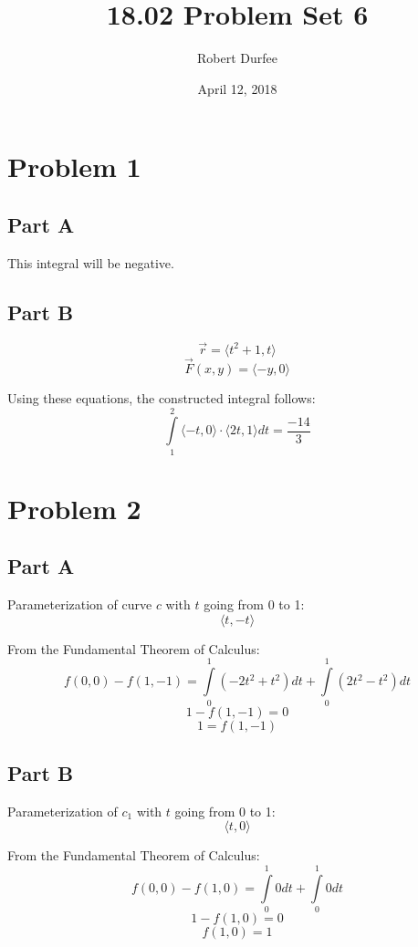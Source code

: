 \documentclass{article}
\title{ 18.02 Problem Set 6 }
\author{ Robert Durfee }
\date{ April 12, 2018 }
\begin{document}
\maketitle

\section*{Problem 1}

\subsection*{Part A}


This integral will be negative.

\subsection*{Part B}

$$\vec{r} = \langle t^2 + 1, t \rangle $$
$$\vec{F}(x, y) = \langle -y, 0 \rangle $$

Using these equations, the constructed integral follows:
$$\int\limits_1^2 \langle -t, 0 \rangle \cdot \langle 2t, 1 \rangle dt =
\frac{-14}{3} $$

\section*{Problem 2}

\subsection*{Part A}

Parameterization of curve $c$ with $t$ going from 0 to 1:
$$ \langle t, -t \rangle $$

From the Fundamental Theorem of Calculus:
$$ f(0, 0) - f(1, -1) = \int\limits_0^1 (-2t^2 + t^2) dt + \int\limits_0^1 (2t^2
- t^2) dt $$
$$ 1 - f(1, -1) = 0 $$
$$ 1 = f(1, -1) $$

\subsection*{Part B}

Parameterization of $c_1$ with $t$ going from 0 to 1:
$$ \langle t, 0 \rangle $$

From the Fundamental Theorem of Calculus:
$$ f(0, 0) - f(1, 0) = \int\limits_0^1 0 dt + \int\limits_0^1 0 dt $$
$$ 1 - f(1, 0) = 0 $$
$$ f(1, 0) = 1 $$
\end{document}
